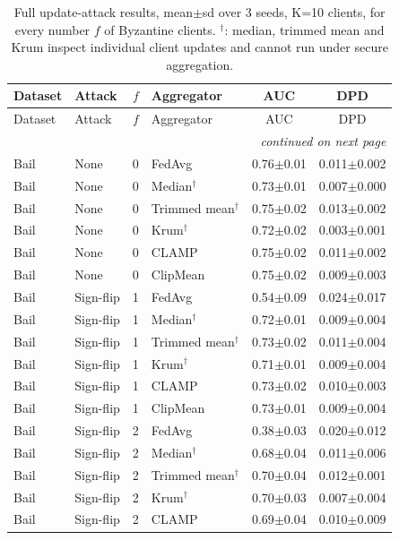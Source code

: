 \footnotesize
\setlength{\tabcolsep}{3pt}
\begin{longtable}{llclcc}
\caption{Full update-attack results, mean$\pm$sd over 3 seeds, K=10 clients, for every number $f$ of Byzantine clients. $^\dagger$: median, trimmed mean and Krum inspect individual client updates and cannot run under secure aggregation.}\label{tab:e3_full}\\
\toprule
Dataset & Attack & $f$ & Aggregator & AUC & DPD \\
\midrule
\endfirsthead
\toprule
Dataset & Attack & $f$ & Aggregator & AUC & DPD \\
\midrule
\endhead
\midrule
\multicolumn{6}{r}{\textit{continued on next page}} \\
\endfoot
\bottomrule
\endlastfoot
Bail & None & 0 & FedAvg & 0.76$\pm$0.01 & 0.011$\pm$0.002 \\
Bail & None & 0 & Median$^\dagger$ & 0.73$\pm$0.01 & 0.007$\pm$0.000 \\
Bail & None & 0 & Trimmed mean$^\dagger$ & 0.75$\pm$0.02 & 0.013$\pm$0.002 \\
Bail & None & 0 & Krum$^\dagger$ & 0.72$\pm$0.02 & 0.003$\pm$0.001 \\
Bail & None & 0 & CLAMP & 0.75$\pm$0.02 & 0.011$\pm$0.002 \\
Bail & None & 0 & ClipMean & 0.75$\pm$0.02 & 0.009$\pm$0.003 \\
Bail & Sign-flip & 1 & FedAvg & 0.54$\pm$0.09 & 0.024$\pm$0.017 \\
Bail & Sign-flip & 1 & Median$^\dagger$ & 0.72$\pm$0.01 & 0.009$\pm$0.004 \\
Bail & Sign-flip & 1 & Trimmed mean$^\dagger$ & 0.73$\pm$0.02 & 0.011$\pm$0.004 \\
Bail & Sign-flip & 1 & Krum$^\dagger$ & 0.71$\pm$0.01 & 0.009$\pm$0.004 \\
Bail & Sign-flip & 1 & CLAMP & 0.73$\pm$0.02 & 0.010$\pm$0.003 \\
Bail & Sign-flip & 1 & ClipMean & 0.73$\pm$0.01 & 0.009$\pm$0.004 \\
Bail & Sign-flip & 2 & FedAvg & 0.38$\pm$0.03 & 0.020$\pm$0.012 \\
Bail & Sign-flip & 2 & Median$^\dagger$ & 0.68$\pm$0.04 & 0.011$\pm$0.006 \\
Bail & Sign-flip & 2 & Trimmed mean$^\dagger$ & 0.70$\pm$0.04 & 0.012$\pm$0.001 \\
Bail & Sign-flip & 2 & Krum$^\dagger$ & 0.70$\pm$0.03 & 0.007$\pm$0.004 \\
Bail & Sign-flip & 2 & CLAMP & 0.69$\pm$0.04 & 0.010$\pm$0.009 \\

\end{longtable}
